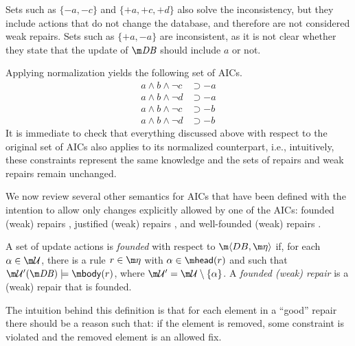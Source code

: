 \begin{example}
  Sets such as $\{{-a},{-c}\}$ and $\{{+a},{+c},{+d}\}$ also solve the inconsistency, but they include actions that do not change the database, and therefore are not considered weak repairs.
  Sets such as $\{{+a},{-a}\}$ are inconsistent, as it is not clear whether they state that the update of $\db$ should include $a$ or not.

  Applying normalization yields the following set of AICs.
  \begin{align*}
    a\land b\land\neg c &\supset{-a} \\
    a\land b\land\neg d &\supset{-a} \\
    a\land b\land\neg c &\supset{-b} \\
    a\land b\land\neg d &\supset{-b}
  \end{align*}
  It is immediate to check that everything discussed above with respect to the original set of AICs also applies to its normalized counterpart, i.e., intuitively, these constraints represent the same knowledge and the sets of repairs and weak repairs remain unchanged. 
\end{example}

 We now review several other semantics for AICs that have been defined with the intention to allow only changes explicitly allowed by one of the AICs: founded (weak) repairs \cite{iclp/CaropreseGSZ06}, justified (weak) repairs \cite{tplp/CaropreseT11}, and well-founded (weak) repairs \cite{tase/Cruz-FilipeGEN13}.

\begin{definition}
 A set of update actions \UU is \emph{founded} with respect to $\fulldb$ if, for each $\alpha \in \UU$, there is a rule  $r\in \aics$ with $\alpha\in\head(r)$ and such that $\UU'(\db)\models \body(r)$, where $\UU'=\UU\setminus\{\alpha\}$. A \emph{founded (weak) repair} is a (weak) repair that is founded.
\end{definition}

The intuition behind this definition is that for each element in a ``good'' repair there should be a reason such that: if the element is removed, some constraint is violated and the removed element is an allowed fix. 


